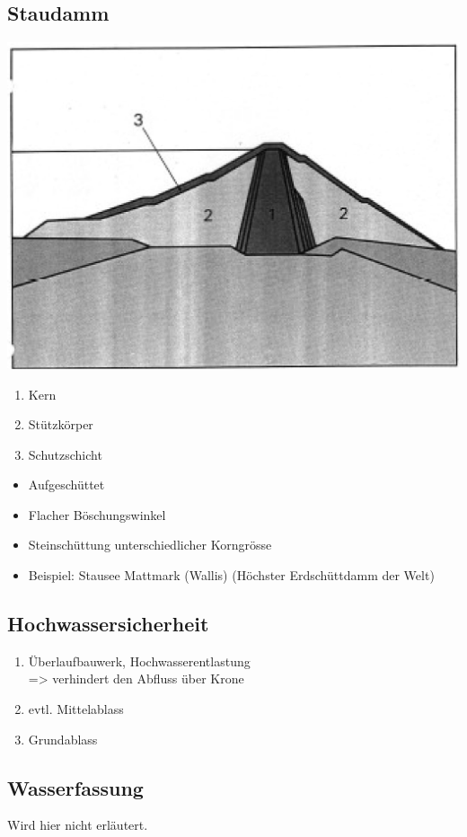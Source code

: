\subsection{Staudamm}


\includegraphics[width=0.8\columnwidth, align=c]{images/Talsperre_3.jpg}

\vspace{0.15cm}

\begin{enumerate}
    \item Kern 
    \item Stützkörper
    \item Schutzschicht
\end{enumerate}

\vspace{0.15cm}

\begin{itemize}
  \item Aufgeschüttet
  \item Flacher Böschungswinkel
  \item Steinschüttung unterschiedlicher Korngrösse
  \item Beispiel: Stausee Mattmark (Wallis) (Höchster Erdschüttdamm der Welt)
\end{itemize}

\vspace{0.15cm}


\subsection{Hochwassersicherheit}

\begin{enumerate}
  \item Überlaufbauwerk, Hochwasserentlastung \\
  => verhindert den Abfluss über Krone
  \item evtl. Mittelablass
  \item Grundablass
\end{enumerate}




\subsection{Wasserfassung}
Wird hier nicht erläutert.

